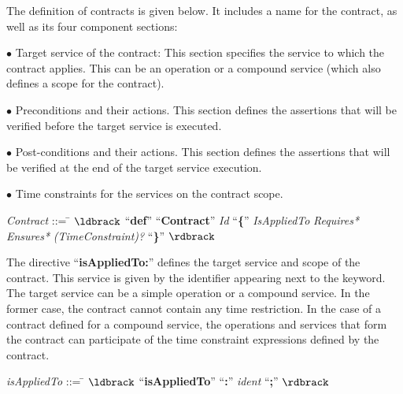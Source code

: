 The definition of contracts is given below. 
It includes a name for the contract, as well as its four component sections:
\begin{trivlist}
\item[$\bullet$] Target service of the contract: This section specifies the service to which the contract applies. This can be an operation or a compound service (which also defines a scope for the contract).
\item[$\bullet$]Preconditions and their actions. This section defines the assertions that will be verified before the target service is executed. 
\item[$\bullet$] Post-conditions and their actions. This section defines the assertions that will be verified at the end of the target service execution. 
\item[$\bullet$] Time constraints for the services on the contract scope.
\end{trivlist} 


\begin{small}
\begin{tabbing}
\reg \textit{Contract} ::= \= $\ldbrack$ ``\textbf{def}'' ``\textbf{Contract}'' 
 \textit{Id} ``\textbf{\{}'' 
    \textit{IsAppliedTo}  
  \textit{Requires*}
  \textit{Ensures*} %
\textit{(TimeConstraint)?} ``\textbf{\}}'' $\rdbrack$ \\[-3mm]
\end{tabbing}
\end{small}

The directive ``\textbf{isAppliedTo:}'' defines the target service and scope of the contract. 
This service is given by the identifier appearing next to the keyword.
The target service can be a simple operation or a compound service. 
In the former case, the contract cannot contain any time restriction.
In the case of a contract defined for a compound service, the operations and services that form the contract can participate of the time constraint expressions defined by the contract. %
\begin{small}
\begin{tabbing}
 \reg \textit{isAppliedTo} ::= \= $\ldbrack$ ``\textbf{isAppliedTo}''
  ``\textbf{:}''  \textit{ident} ``\textbf{;}'' $\rdbrack$ \\[-3mm]
  \end{tabbing}
\end{small}

